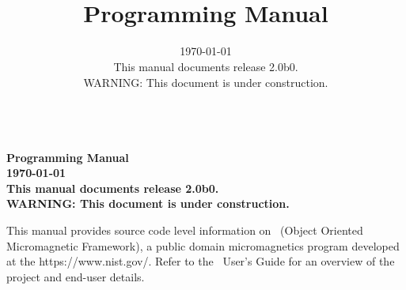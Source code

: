 \documentclass[12pt]{report}
\title{\OOMMF\\Programming Manual}
\author{\today\\[1ex]
This manual documents release 2.0b0.\\[1ex]
WARNING: This document is under construction.}
\begin{document}
\nocite{brown1963,donahue1999}


\iflatexml
\maketitle
\else
\begin{titlepage}
\setcounter{page}{0}    %
\par
\begin{center}
\Large\bf
\OOMMF\\
Programming Manual\\[2ex]
\large
{\today}
{}\\[2ex]
This manual documents release 2.0b0.\\[1ex]
WARNING: This document is under construction.
\end{center}
This manual provides source code level information on \OOMMF\ (Object Oriented Micromagnetic Framework),
a public domain micromagnetics program developed at the
{https://www.nist.gov/}.  Refer to the \OOMMF\ User's Guide for an
overview of the project and end-user details.
\end{titlepage}
\fi

\iflatexml
%
%
 \renewcommand{\contentsname}{}
\else
 \renewcommand{\contentsname}{Table of Contents}
\fi
\tableofcontents
\end{document}
